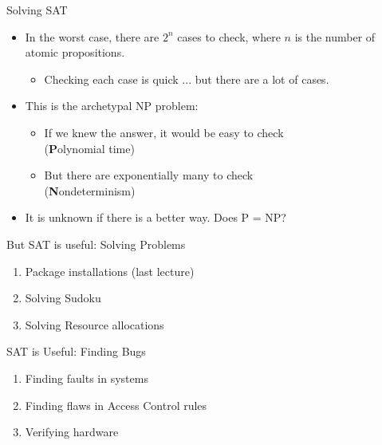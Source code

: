 \documentclass[xetex,aspectratio=169,14pt,hyperref={pdfpagelabels=true,pdflang={en-GB}}]{beamer}
\begin{document}
\begin{frame}
  {Solving SAT}

  \begin{itemize}
  \item In the worst case, there are $2^n$ cases to check, where $n$
    is the number of atomic propositions.
    \begin{itemize}
    \item Checking each case is quick ... but there are a lot of cases.
    \end{itemize}
  \item This is the archetypal NP problem:
    \begin{itemize}
    \item If we knew the answer, it would be easy to check \\
      \qquad (\textbf{P}olynomial time)
    \item But there are exponentially many to check \\
      \qquad (\textbf{N}ondeterminism)
    \end{itemize}
  \item It is unknown if there is a better way. Does P = NP?
  \end{itemize}
\end{frame}

\begin{frame}
  {But SAT is useful: Solving Problems}

  \begin{enumerate}
  \item Package installations (last lecture) \\
  \item Solving Sudoku \\
  \item Solving Resource allocations \\
  \end{enumerate}

\end{frame}

\begin{frame}
  {SAT is Useful: Finding Bugs}

  \begin{enumerate}
  \item Finding faults in systems \\
  \item Finding flaws in Access Control rules \\
  \item Verifying hardware \\
  \end{enumerate}
\end{frame}
\end{document}

